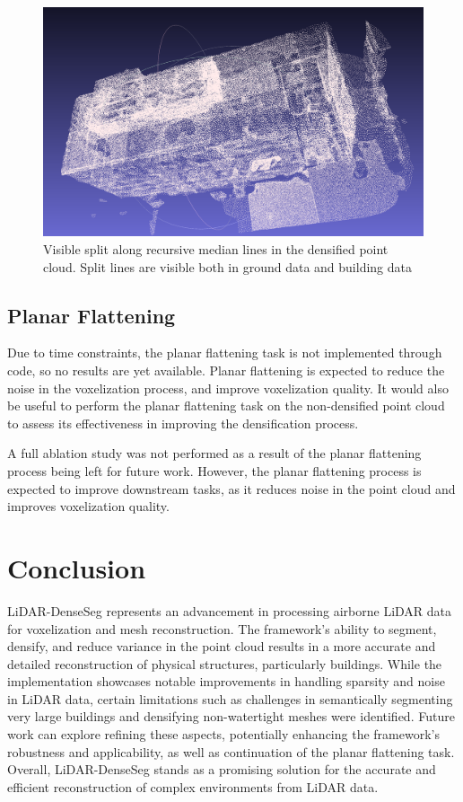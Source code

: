 \documentclass[10pt,twocolumn,letterpaper]{article}
\begin{document}
    \begin{figure}
        \centering
        \includegraphics[width=\linewidth]{visible_split.png}
        \caption{Visible split along recursive median lines in the densified point cloud. Split lines are visible both in ground data and building data}
        \label{fig:median-split}
    \end{figure}

    \subsection{Planar Flattening}\label{subsec:planar-flattening-results}

    Due to time constraints, the planar flattening task is not implemented through code, so no results are yet available.
    Planar flattening is expected to reduce the noise in the voxelization process, and improve voxelization quality.
    It would also be useful to perform the planar flattening task on the non-densified point cloud to assess its effectiveness in improving the densification process.

    A full ablation study was not performed as a result of the planar flattening process being left for future work. 
    However, the planar flattening process is expected to improve downstream tasks, as it reduces noise in the point cloud and improves voxelization quality.

    \section{Conclusion}\label{sec:conclusion}

    LiDAR-DenseSeg represents an advancement in processing airborne LiDAR data for voxelization and mesh reconstruction. The framework's ability to segment, densify, and reduce variance in the point cloud results in a more accurate and detailed reconstruction of physical structures, particularly buildings. While the implementation showcases notable improvements in handling sparsity and noise in LiDAR data, certain limitations such as challenges in semantically segmenting very large buildings and densifying non-watertight meshes were identified. Future work can explore refining these aspects, potentially enhancing the framework's robustness and applicability, as well as continuation of the planar flattening task. Overall, LiDAR-DenseSeg stands as a promising solution for the accurate and efficient reconstruction of complex environments from LiDAR data.
\end{document}
